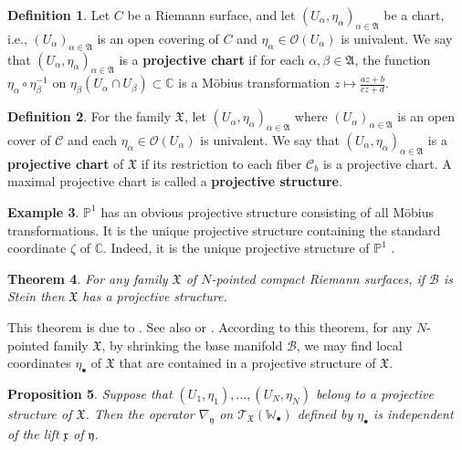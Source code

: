 \documentclass[11pt,b5paper,notitlepage]{article}
\theoremstyle{definition}
\newtheorem{df}{Definition}[section]
\newtheorem{eg}[df]{Example}
\theoremstyle{plain}
\newtheorem{thm}[df]{Theorem}
\newtheorem{pp}[df]{Proposition}
\newcommand{\fk}{\mathfrak}
\newcommand{\mc}{\mathcal}
\newcommand{\scr}{\mathscr}
\newcommand{\xk}{\mathfrak x}
\newcommand{\yk}{\mathfrak y}
\newcommand{\blt}{\bullet}
\newcommand{\Wbb}{\mathbb W}
\newcommand{\Cbb}{\mathbb C}
\newcommand{\Pbb}{\mathbb P}
\numberwithin{equation}{section}
\begin{document}
\begin{df}
Let $C$ be a Riemann surface, and let $(U_{\alpha},\eta_\alpha)_{\alpha\in\fk A}$ be a chart, i.e., $(U_\alpha)_{\alpha\in\fk A}$ is an open covering of $C$ and $\eta_\alpha\in\scr O(U_\alpha)$ is univalent. We say that $(U_{\alpha},\eta_\alpha)_{\alpha\in\fk A}$ is a \textbf{projective chart}  if for each $\alpha,\beta\in\fk A$, the function $\eta_\alpha\circ\eta_\beta^{-1}$ on $\eta_\beta(U_\alpha\cap U_\beta)\subset\Cbb$ is a M\"obius transformation $z\mapsto \frac{az+b}{cz+d}$.
\end{df}










\begin{df}
For the family $\fk X$, let $(U_{\alpha},\eta_\alpha)_{\alpha\in\fk A}$ where $(U_\alpha)_{\alpha\in\fk A}$ is an open cover of $\mc C$ and each $\eta_\alpha\in\scr O(U_\alpha)$ is univalent. We say that  $(U_{\alpha},\eta_\alpha)_{\alpha\in\fk A}$ is a \textbf{projective chart} of $\fk X$ if its restriction to each fiber $\mc C_b$ is a projective chart. A maximal projective chart is called a \textbf{projective structure}.
\end{df}



\begin{eg}
$\Pbb^1$ has an obvious projective structure consisting of all M\"obius transformations. It is the unique projective structure containing the standard coordinate $\zeta$ of $\Cbb$. Indeed, it is the unique projective structure of $\Pbb^1$ \cite[8.2.12]{FB04}.
\end{eg}

\begin{thm}
For any family $\fk X$ of $N$-pointed compact Riemann surfaces, if $\mc B$ is Stein then $\fk X$ has a projective structure.
\end{thm}
This theorem is due to \cite{Hub80}. See also \cite[Sec. 4.1]{Gui} or \cite[Sec. B]{Gui}. According to this theorem, for any $N$-pointed family $\fk X$, by shrinking the base manifold $\mc B$, we may find local coordinates $\eta_\blt$ of $\fk X$ that are contained in a projective structure of $\fk X$.




\begin{pp}\label{lb151}
Suppose that $(U_1,\eta_1),\dots,(U_N,\eta_N)$ belong to a projective structure of $\fk X$. Then the operator $\nabla_\yk$ on $\scr T_{\fk X}(\Wbb_\blt)$ defined by $\eta_\blt$ is independent of the lift $\xk$ of $\yk$.
\end{pp}
\end{document}
